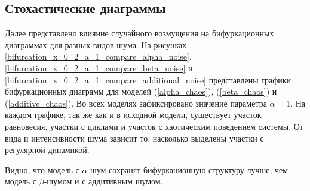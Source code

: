 \subsection{Стохастические диаграммы}

    Далее представлено влияние случайного возмущения на бифуркационных диаграммах для разных видов шума. На рисунках \ref{bifurcation_x_0_2_a_1_compare_alpha_noise}, \ref{bifurcation_x_0_2_a_1_compare_beta_noise} и \ref{bifurcation_x_0_2_a_1_compare_additional_noise} представлены графики бифуркационных диаграмм для моделей (\ref{alpha_chaos}), (\ref{beta_chaos}) и (\ref{additive_chaos}). Во всех моделях зафиксировано значение параметра \(\alpha = 1\). На каждом графике, так же как и в исходной модели, существует участок равновесия, участки с циклами и участок с хаотическим поведением системы. От вида и интенсивности шума зависит то, насколько выделены участки с регулярной динамикой.

    Видно, что модель с \(\alpha\)-шум сохранят бифуркационную структуру лучше, чем модель с \(\beta\)-шумом и с аддитивным шумом.

